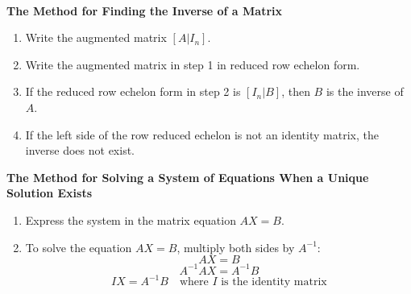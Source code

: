 \begin{summarybox}
    ~\\
    \textbf{The Method for Finding the Inverse of a Matrix}
    \begin{enumerate}
        \item Write the augmented matrix $[ A | I_n ]$.
        \item Write the augmented matrix in step 1 in reduced row echelon form.
        \item If the reduced row echelon form in step 2 is $[ I_n | B]$, then $B$ is the inverse of $A$.
        \item If the left side of the row reduced echelon is not an identity matrix, the inverse does not exist.
    \end{enumerate}

    \textbf{The Method for Solving a System of Equations When a Unique Solution Exists}
    \begin{enumerate}
        \item Express the system in the matrix equation $AX = B$.
        \item To solve the equation $AX = B$, multiply both sides by $A^{-1}$:
              \[
                  AX = B
              \]
              \[
                  A^{-1}AX = A^{-1}B
              \]
              \[
                  I X = A^{-1}B \quad \text{where $I$ is the identity matrix}
              \]
    \end{enumerate}

\end{summarybox}